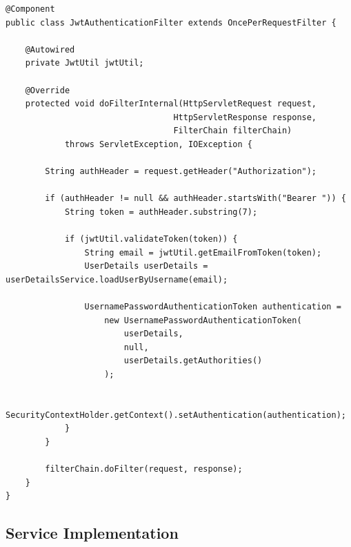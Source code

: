 \documentclass[12pt,a4paper,twoside]{book}
\begin{document}
\begin{lstlisting}[style=java]
@Component
public class JwtAuthenticationFilter extends OncePerRequestFilter {
    
    @Autowired
    private JwtUtil jwtUtil;
    
    @Override
    protected void doFilterInternal(HttpServletRequest request, 
                                  HttpServletResponse response, 
                                  FilterChain filterChain) 
            throws ServletException, IOException {
        
        String authHeader = request.getHeader("Authorization");
        
        if (authHeader != null && authHeader.startsWith("Bearer ")) {
            String token = authHeader.substring(7);
            
            if (jwtUtil.validateToken(token)) {
                String email = jwtUtil.getEmailFromToken(token);
                UserDetails userDetails = userDetailsService.loadUserByUsername(email);
                
                UsernamePasswordAuthenticationToken authentication = 
                    new UsernamePasswordAuthenticationToken(
                        userDetails, 
                        null, 
                        userDetails.getAuthorities()
                    );
                
                SecurityContextHolder.getContext().setAuthentication(authentication);
            }
        }
        
        filterChain.doFilter(request, response);
    }
}
\end{lstlisting}

\subsection{Service Implementation}
\end{document}
